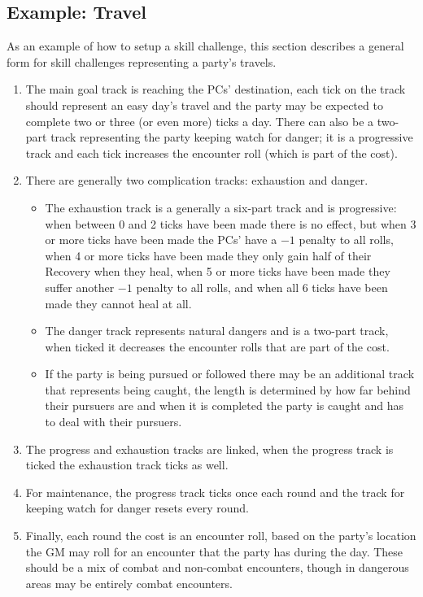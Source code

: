 \subsection{Example: Travel}
As an example of how to setup a skill challenge, this section describes a general form for skill challenges representing a party's travels.
\begin{enumerate}
  \item The main goal track is reaching the PCs' destination, each tick on the track should represent an easy day's travel and the party may be expected to complete two or three (or even more) ticks a day.
    There can also be a two-part track representing the party keeping watch for danger; it is a progressive track and each tick increases the encounter roll (which is part of the cost).
  \item There are generally two complication tracks: exhaustion and danger.
  \begin{itemize}
    \item The exhaustion track is a generally a six-part track and is progressive: when between 0 and 2 ticks have been made there is no effect, but when 3 or more ticks have been made the PCs' have a $-1$ penalty to all rolls, when 4 or more ticks have been made they only gain half of their Recovery when they heal, when 5 or more ticks have been made they suffer another $-1$ penalty to all rolls, and when all 6 ticks have been made they cannot heal at all.
    \item The danger track represents natural dangers and is a two-part track, when ticked it decreases the encounter rolls that are part of the cost.
    \item If the party is being pursued or followed there may be an additional track that represents being caught, the length is determined by how far behind their pursuers are and when it is completed the party is caught and has to deal with their pursuers.
  \end{itemize}
  \item The progress and exhaustion tracks are linked, when the progress track is ticked the exhaustion track ticks as well.
  \item For maintenance, the progress track ticks once each round and the track for keeping watch for danger resets every round.
  \item Finally, each round the cost is an encounter roll, based on the party's location the GM may roll for an encounter that the party has during the day.
    These should be a mix of combat and non-combat encounters, though in dangerous areas may be entirely combat encounters.
\end{enumerate}
